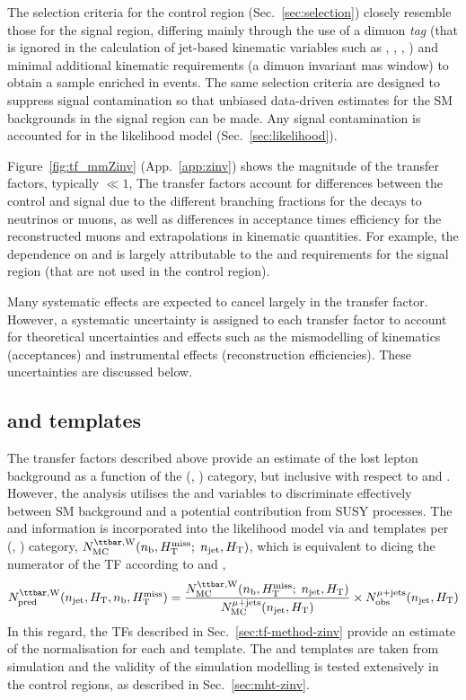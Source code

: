 The selection criteria for the \mmj control region
(Sec.~\ref{sec:selection}) closely resemble those for the signal
region, differing mainly through the use of a dimuon {\it tag} (that
is ignored in the calculation of jet-based kinematic variables such as
\scalht, \mht, \alphat, \etc) and minimal additional kinematic
requirements (\eg a dimuon invariant mas window) to obtain a sample
enriched in \zmmj events. The same selection criteria are designed to
suppress signal contamination so that unbiased data-driven estimates
for the SM backgrounds in the signal region can be made. Any signal
contamination is accounted for in the likelihood model
(Sec.~\ref{sec:likelihood}).

Figure~\ref{fig:tf_mmZinv} (App.~\ref{app:zinv}) shows the
magnitude of the transfer factors, typically $\ll 1$, The transfer
factors account for differences between the \mmj control and signal
due to the different branching fractions for the decays to neutrinos
or muons, as well as differences in acceptance times efficiency for
the reconstructed muons and extrapolations in kinematic
quantities. For example, the dependence on \njet and \scalht is
largely attributable to the \alphat and \bdphi requirements for the
signal region (that are not used in the \mmj control region).

Many systematic effects are expected to cancel largely in the transfer
factor. However, a systematic uncertainty is assigned to each transfer
factor to account for theoretical uncertainties and effects such as
the mismodelling of kinematics (\eg acceptances) and instrumental
effects (\eg reconstruction efficiencies). These uncertainties are
discussed below. 

\subsection{\texorpdfstring{\nb}{Nb} and \texorpdfstring{\mht}{MHT} templates}

The transfer factors described above provide an estimate of the lost
lepton background as a function of the (\njet, \scalht) category, but
inclusive with respect to \nb and \mht. However, the analysis utilises
the \nb and \mht variables to discriminate effectively between SM
background and \eg a potential contribution from SUSY processes. The
\nb and \HTmiss information is incorporated into the likelihood model
via \nb and \mht templates per (\njet, \scalht) category, $N_{\rm
  MC}^{\ttw}(\nb, \HTmiss;\; \njet, \scalht)$, which is equivalent to
dicing the numerator of the TF according to \nb and \mht, \ie
\begin{equation}
  \label{equ:pred-method-zinv-mht}
  \npre^{\ttw}(\njet, \scalht, \nb, \HTmiss) = 
  \frac{N_{\rm MC}^{\ttw}(\nb, \HTmiss;\; \njet, \scalht)}{N_{\rm MC}^{\mj}(\njet, \scalht)} 
  \times 
  \nobs^{\mj}(\njet, \scalht)
\end{equation}
In this regard, the TFs described in Sec.~\ref{sec:tf-method-zinv}
provide an estimate of the normalisation for each \nb and \mht
template. The \nb and \HTmiss templates are taken from simulation and
the validity of the simulation modelling is tested extensively in the
control regions, as described in Sec.~\ref{sec:mht-zinv}.

